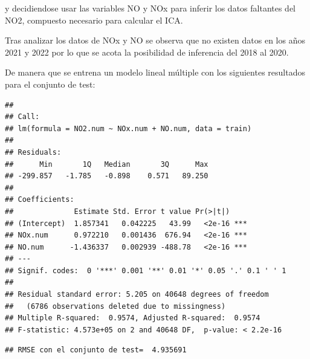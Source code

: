 \documentclass[notspecified,article,submit,moreauthors,pdftex]{Definitions/mdpi}
\begin{document}
y decidiendose usar las variables NO y NOx para inferir los datos
faltantes del NO2, compuesto necesario para calcular el ICA.

Tras analizar los datos de NOx y NO se observa que no existen datos en
los años 2021 y 2022 por lo que se acota la posibilidad de inferencia
del 2018 al 2020.

De manera que se entrena un modelo lineal múltiple con los siguientes
resultados para el conjunto de test:

\begin{verbatim}
## 
## Call:
## lm(formula = NO2.num ~ NOx.num + NO.num, data = train)
## 
## Residuals:
##      Min       1Q   Median       3Q      Max 
## -299.857   -1.785   -0.898    0.571   89.250 
## 
## Coefficients:
##              Estimate Std. Error t value Pr(>|t|)    
## (Intercept)  1.857341   0.042225   43.99   <2e-16 ***
## NOx.num      0.972210   0.001436  676.94   <2e-16 ***
## NO.num      -1.436337   0.002939 -488.78   <2e-16 ***
## ---
## Signif. codes:  0 '***' 0.001 '**' 0.01 '*' 0.05 '.' 0.1 ' ' 1
## 
## Residual standard error: 5.205 on 40648 degrees of freedom
##   (6786 observations deleted due to missingness)
## Multiple R-squared:  0.9574, Adjusted R-squared:  0.9574 
## F-statistic: 4.573e+05 on 2 and 40648 DF,  p-value: < 2.2e-16
\end{verbatim}

\begin{verbatim}
## RMSE con el conjunto de test=  4.935691
\end{verbatim}
\end{document}
